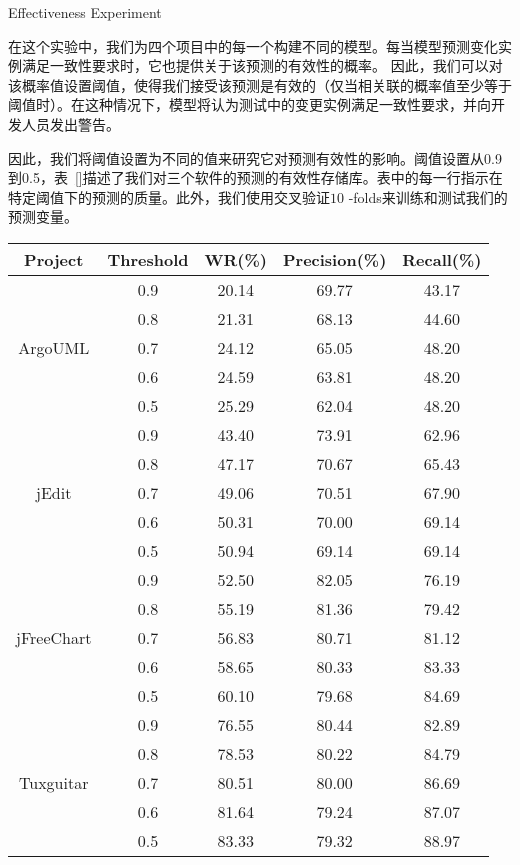 {
{Effectiveness Experiment}

在这个实验中，我们为四个项目中的每一个构建不同的模型。每当模型预测变化实例满足一致性要求时，它也提供关于该预测的有效性的概率。 因此，我们可以对该概率值设置阈值，使得我们接受该预测是有效的（仅当相关联的概率值至少等于阈值时）。在这种情况下，模型将认为测试中的变更实例满足一致性要求，并向开发人员发出警告。

因此，我们将阈值设置为不同的值来研究它对预测有效性的影响。阈值设置从0.9到0.5，表~\ref{}描述了我们对三个软件的预测的有效性存储库。表中的每一行指示在特定阈值下的预测的质量。此外，我们使用交叉验证$ 10 $ -folds来训练和测试我们的预测变量。

\begin{table}[htbp]
\vspace{0.5em}\centering\wuhao
\begin{tabular}{ccccc}
\toprule[1.5pt]
\textbf{Project}&\textbf{Threshold}&\textbf{WR(\%)}&\textbf{Precision(\%)}&\textbf{Recall(\%)}\\

\midrule[1pt]
 \multirow{5}{*}{ArgoUML}
&0.9&	20.14&	69.77&	43.17\\
&0.8&	21.31&	68.13&	44.60\\
&0.7&	24.12&	65.05&	48.20\\
&0.6&	24.59&	63.81&	48.20\\
&0.5&	25.29&	62.04&	48.20\\
\hline
\multirow{5}{*}{jEdit}
&0.9&	43.40&	73.91&	62.96\\
&0.8&	47.17&	70.67&	65.43\\
&0.7&	49.06&	70.51&	67.90\\
&0.6&	50.31&	70.00&	69.14\\
&0.5&	50.94&	69.14&	69.14\\
\hline
\multirow{5}{*}{jFreeChart}
&0.9&	52.50&	82.05&	76.19\\
&0.8&	55.19&	81.36&	79.42\\
&0.7&	56.83&	80.71&	81.12\\
&0.6&	58.65&	80.33&	83.33\\
&0.5&	60.10&	79.68&	84.69\\
\hline
\multirow{5}{*}{Tuxguitar}
&0.9	&76.55&   80.44&	82.89\\
&0.8	&78.53&	80.22&	84.79\\
&0.7	&80.51&	80.00&	86.69\\
&0.6	&81.64&	79.24&	87.07\\
&0.5    &83.33&	79.32&	88.97\\
\bottomrule[1.5pt]
\end{tabular}
\end{table}

}

